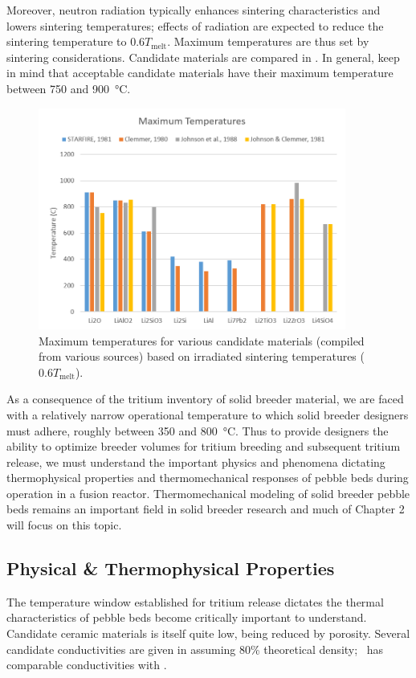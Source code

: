\documentclass[11pt]{report} %
\newcommand{\lit}{\ce{Li2TiO3}}
\newcommand{\lis}{\ce{Li4SiO4}}
\begin{document}
Moreover, neutron radiation typically enhances sintering characteristics and lowers sintering temperatures; effects of radiation are expected to reduce the sintering temperature to $0.6 T_\text{melt}$.\cite{Johnson1981} Maximum temperatures are thus set by sintering considerations. Candidate materials are compared in . In general, keep in mind that acceptable candidate materials have their maximum temperature between 750 and \SI{900}{\celsius}. 

\begin{figure}[ht]
	\centering
	\includegraphics[width=0.9\textwidth]{images/Tmax} 
	\caption{Maximum temperatures for various candidate materials (compiled from various sources) based on irradiated sintering temperatures ($0.6T_\text{melt}$).}
	\label{fig:Tmax}
\end{figure}

As a consequence of the tritium inventory of solid breeder material, we are faced with a relatively narrow operational temperature to which solid breeder designers must adhere, roughly between 350 and \SI{800}{\celsius}. Thus to provide designers the ability to optimize breeder volumes for tritium breeding and subsequent tritium release, we must understand the important physics and phenomena dictating thermophysical properties and thermomechanical responses of pebble beds during operation in a fusion reactor. Thermomechanical modeling of solid breeder pebble beds remains an important field in solid breeder research and much of Chapter 2 will focus on this topic.


\FloatBarrier
\subsection{Physical \& Thermophysical Properties}
The temperature window established for tritium release dictates the thermal characteristics of pebble beds become critically important to understand. Candidate ceramic materials is itself quite low, being reduced by porosity. Several candidate conductivities are given in  assuming 80\% theoretical density; \lit~has comparable conductivities with \lis.
\end{document}
